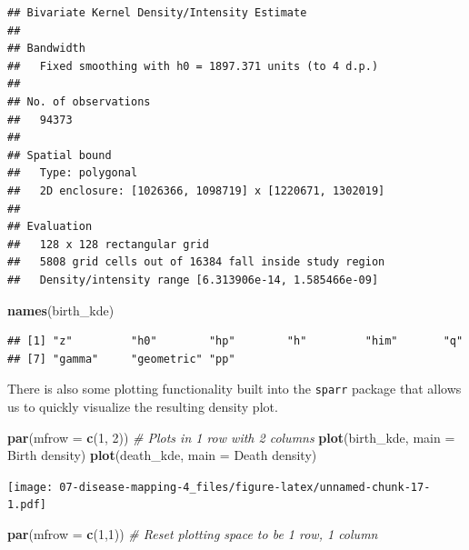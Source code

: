 \documentclass[
]{book}
\newenvironment{Shaded}{\begin{snugshade}}{\end{snugshade}}
\newcommand{\AttributeTok}[1]{\textcolor[rgb]{0.13,0.29,0.53}{#1}}
\newcommand{\CommentTok}[1]{\textcolor[rgb]{0.56,0.35,0.01}{\textit{#1}}}
\newcommand{\DecValTok}[1]{\textcolor[rgb]{0.00,0.00,0.81}{#1}}
\newcommand{\FunctionTok}[1]{\textcolor[rgb]{0.13,0.29,0.53}{\textbf{#1}}}
\newcommand{\NormalTok}[1]{#1}
\newcommand{\StringTok}[1]{\textcolor[rgb]{0.31,0.60,0.02}{#1}}
\begin{document}
\begin{verbatim}
## Bivariate Kernel Density/Intensity Estimate
## 
## Bandwidth
##   Fixed smoothing with h0 = 1897.371 units (to 4 d.p.)
## 
## No. of observations
##   94373 
## 
## Spatial bound
##   Type: polygonal
##   2D enclosure: [1026366, 1098719] x [1220671, 1302019]
## 
## Evaluation
##   128 x 128 rectangular grid
##   5808 grid cells out of 16384 fall inside study region
##   Density/intensity range [6.313906e-14, 1.585466e-09]
\end{verbatim}

\begin{Shaded}
\begin{Highlighting}[]
\FunctionTok{names}\NormalTok{(birth\_kde)}
\end{Highlighting}
\end{Shaded}

\begin{verbatim}
## [1] "z"         "h0"        "hp"        "h"         "him"       "q"        
## [7] "gamma"     "geometric" "pp"
\end{verbatim}

There is also some plotting functionality built into the \texttt{sparr} package that allows us to quickly visualize the resulting density plot.

\begin{Shaded}
\begin{Highlighting}[]
\FunctionTok{par}\NormalTok{(}\AttributeTok{mfrow =} \FunctionTok{c}\NormalTok{(}\DecValTok{1}\NormalTok{, }\DecValTok{2}\NormalTok{)) }\CommentTok{\# Plots in 1 row with 2 columns}
\FunctionTok{plot}\NormalTok{(birth\_kde, }\AttributeTok{main =} \StringTok{\textquotesingle{}Birth density\textquotesingle{}}\NormalTok{)}
\FunctionTok{plot}\NormalTok{(death\_kde, }\AttributeTok{main =} \StringTok{\textquotesingle{}Death density\textquotesingle{}}\NormalTok{)}
\end{Highlighting}
\end{Shaded}

\texttt{[image: 07-disease-mapping-4\_files/figure-latex/unnamed-chunk-17-1.pdf]}

\begin{Shaded}
\begin{Highlighting}[]
\FunctionTok{par}\NormalTok{(}\AttributeTok{mfrow =} \FunctionTok{c}\NormalTok{(}\DecValTok{1}\NormalTok{,}\DecValTok{1}\NormalTok{))  }\CommentTok{\# Reset plotting space to be 1 row, 1 column}
\end{Highlighting}
\end{Shaded}
\end{document}
